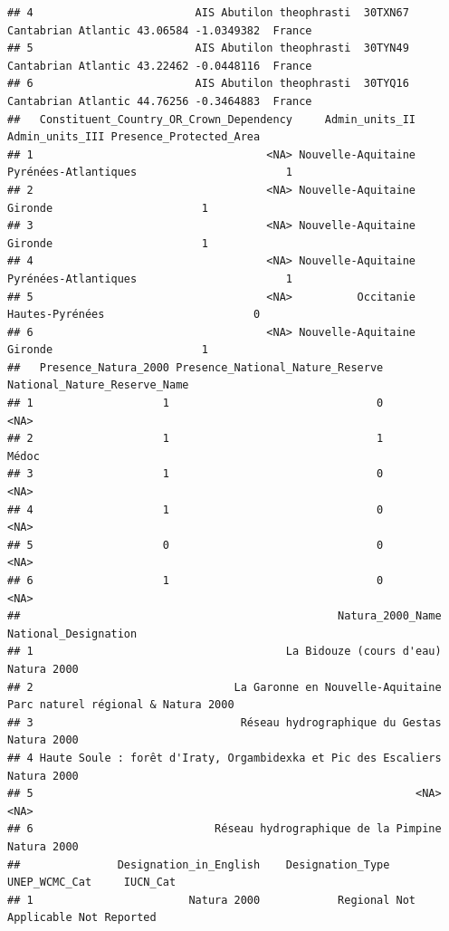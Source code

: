 \documentclass[
]{article}
\begin{document}
\begin{verbatim}
## 4                         AIS Abutilon theophrasti  30TXN67 Cantabrian Atlantic 43.06584 -1.0349382  France
## 5                         AIS Abutilon theophrasti  30TYN49 Cantabrian Atlantic 43.22462 -0.0448116  France
## 6                         AIS Abutilon theophrasti  30TYQ16 Cantabrian Atlantic 44.76256 -0.3464883  France
##   Constituent_Country_OR_Crown_Dependency     Admin_units_II      Admin_units_III Presence_Protected_Area
## 1                                    <NA> Nouvelle-Aquitaine Pyrénées-Atlantiques                       1
## 2                                    <NA> Nouvelle-Aquitaine              Gironde                       1
## 3                                    <NA> Nouvelle-Aquitaine              Gironde                       1
## 4                                    <NA> Nouvelle-Aquitaine Pyrénées-Atlantiques                       1
## 5                                    <NA>          Occitanie      Hautes-Pyrénées                       0
## 6                                    <NA> Nouvelle-Aquitaine              Gironde                       1
##   Presence_Natura_2000 Presence_National_Nature_Reserve National_Nature_Reserve_Name
## 1                    1                                0                         <NA>
## 2                    1                                1                        Médoc
## 3                    1                                0                         <NA>
## 4                    1                                0                         <NA>
## 5                    0                                0                         <NA>
## 6                    1                                0                         <NA>
##                                                 Natura_2000_Name                National_Designation
## 1                                       La Bidouze (cours d'eau)                         Natura 2000
## 2                               La Garonne en Nouvelle-Aquitaine Parc naturel régional & Natura 2000
## 3                                Réseau hydrographique du Gestas                         Natura 2000
## 4 Haute Soule : forêt d'Iraty, Orgambidexka et Pic des Escaliers                         Natura 2000
## 5                                                           <NA>                                <NA>
## 6                            Réseau hydrographique de la Pimpine                         Natura 2000
##               Designation_in_English    Designation_Type  UNEP_WCMC_Cat     IUCN_Cat
## 1                        Natura 2000            Regional Not Applicable Not Reported

\end{verbatim}
\end{document}
